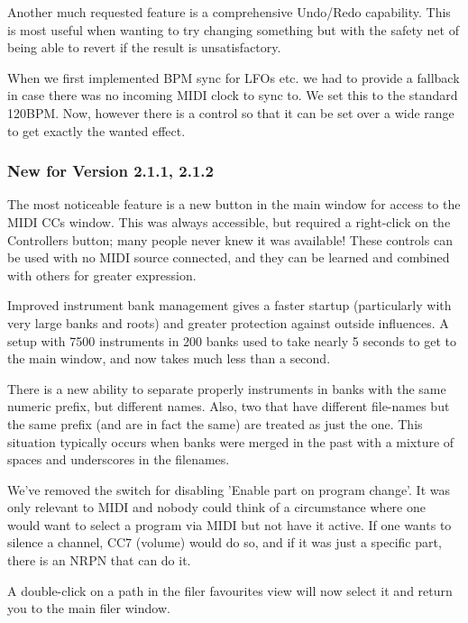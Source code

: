 \documentclass[
 11pt,
 twoside,
 a4paper,
 final                                 %
]{article}
\begin{document}
   Another much requested feature is a comprehensive Undo/Redo capability.
   This is most useful when wanting to try changing something but with the
   safety net of being able to revert if the result is unsatisfactory.

   When we first implemented BPM sync for LFOs etc. we had to provide a
   fallback in case there was no incoming MIDI clock to sync to. We set
   this to the standard 120BPM. Now, however there is a control so that it
   can be set over a wide range to get exactly the wanted effect.

\subsubsection{New for Version 2.1.1, 2.1.2}
\label{subsubsec:new_features_2_1_1}

   The most noticeable feature is a new button in the main window for access to
   the MIDI CCs window. This was always accessible, but required a right-click on
   the Controllers button; many people never knew it was available!
   These controls can be used with no MIDI source connected, and they can be
   learned and combined with others for greater expression.

   Improved instrument bank management gives a faster startup (particularly
   with very large banks and roots) and greater protection against outside
   influences. A setup with 7500 instruments in 200 banks used to take nearly 5
   seconds to get to the main window, and now takes much less than a second.

   There is a new ability to separate properly instruments in banks with the
   same numeric prefix, but different names. Also, two that have different
   file-names but the same prefix (and are in fact the same) are treated as
   just the one. This situation typically occurs when banks were merged in the
   past with a mixture of spaces and underscores in the filenames.

   We've removed the switch for disabling 'Enable part on program change'. It
   was only relevant to MIDI and nobody could think of a circumstance where one
   would want to select a program via MIDI but not have it active. If one wants
   to silence a channel, CC7 (volume) would do so, and if it was just a
   specific part, there is an NRPN that can do it.

   A double-click on a path in the filer favourites view will now select it and
   return you to the main filer window.
\end{document}
